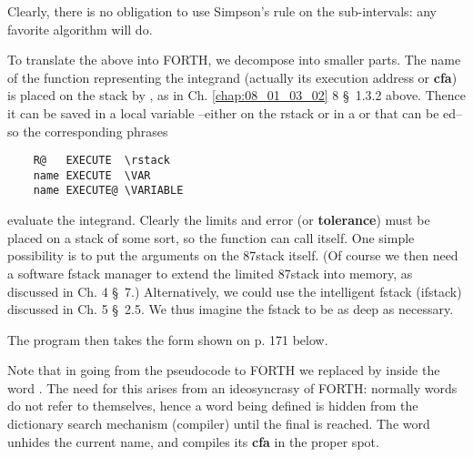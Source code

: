 Clearly, there is no obligation to use Simpson's rule on the sub-intervals: any favorite algorithm will do.

To translate the above into FORTH, we decompose into smaller parts. The name of the function representing the integrand (actually its execution address or \textbf{cfa}) is placed on the stack by , as in Ch. \ref{chap:08_01_03_02} 8 \S\ 1.3.2 above. Thence it can be saved in a local variable --either on the rstack or in a  or  that can be ed-- so the corresponding phrases

\begin{lstlisting}
    R@   EXECUTE  \rstack
    name EXECUTE  \VAR
    name EXECUTE@ \VARIABLE
\end{lstlisting}

evaluate the integrand. Clearly the limits and error (or \textbf{tolerance}) must be placed on a stack of some sort, so the function can call itself. One simple possibility is to put the arguments on the 87stack itself. (Of course we then need a software fstack manager to extend the limited 87stack into memory, as discussed in Ch. 4 \S\ 7.) Alternatively, we could use the intelligent fstack (ifstack) discussed in Ch. 5 \S\ 2.5. We thus imagine the fstack to be as deep as necessary.

The program then takes the form shown on p. 171 below.

Note that in going from the pseudocode to FORTH we replaced  by  inside the word . The need for this arises from an ideosyncrasy of FORTH: normally words do not refer to themselves, hence a word being defined is hidden from the dictionary search mechanism (compiler) until the final \bc{;} is reached. The word  unhides the current name, and compiles its \textbf{cfa} in the proper spot.

